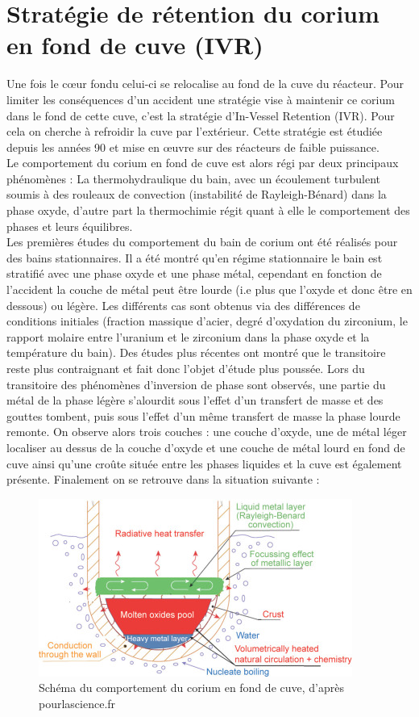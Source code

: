 \documentclass[a4paper,11pt,fleqn]{report}    %
\begin{document}
\section{Stratégie de rétention du corium en fond de cuve (IVR)}
Une fois le c\oe ur fondu celui-ci se relocalise au fond de la cuve du réacteur. Pour limiter les conséquences d'un accident une stratégie vise à maintenir ce corium dans le fond de cette cuve, c'est la stratégie d'In-Vessel Retention (IVR). Pour cela on cherche à refroidir la cuve par l'extérieur. Cette stratégie est étudiée depuis les années 90 et mise en \oe uvre sur des réacteurs de faible puissance. \\
Le comportement du corium en fond de cuve est alors régi par deux principaux phénomènes :
La thermohydraulique du bain, avec un écoulement turbulent soumis à des rouleaux de convection (instabilité de Rayleigh-Bénard) dans la phase oxyde, d'autre part la thermochimie régit quant à elle le comportement des phases et leurs équilibres. \\
Les premières études du comportement du bain de corium ont été réalisés pour des bains stationnaires. Il a été montré qu'en régime stationnaire le bain est stratifié avec une phase oxyde et une phase métal, cependant en fonction de l'accident la couche de métal peut être lourde (i.e plus que l'oxyde et donc être en dessous) ou légère. Les différents cas sont obtenus via des différences de conditions initiales (fraction massique d'acier, degré d'oxydation du zirconium, le rapport molaire entre l'uranium et le zirconium dans la phase oxyde et la température du bain). Des études plus récentes ont montré que le transitoire reste plus contraignant et fait donc l'objet d'étude plus poussée. Lors du transitoire des phénomènes d'inversion de phase sont observés, une partie du métal de la phase légère s'alourdit sous l'effet d'un transfert de masse et des gouttes tombent, puis sous l'effet d'un même transfert de masse la phase lourde remonte. On observe alors trois couches : une couche d'oxyde, une de métal léger localiser au dessus de la couche d'oxyde et une couche de métal lourd en fond de cuve ainsi qu'une croûte située entre les phases liquides et la cuve est également présente. Finalement on se retrouve dans la situation suivante :
\begin{figure}[h!]
	\centering
	\includegraphics[width=0.6\linewidth]{figure/IVR_schema}
	\caption[Schéma du comportement du corium en fond de cuve]{Schéma du comportement du corium en fond de cuve, d'après pourlascience.fr}
	\label{fig:ivrschema}
\end{figure}\\
\end{document}
